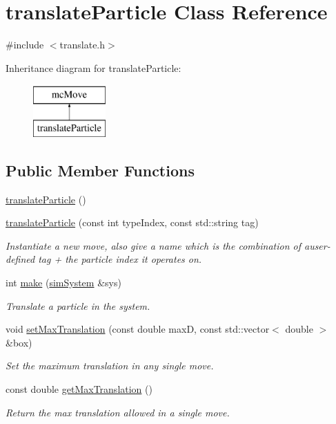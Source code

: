 \hypertarget{classtranslate_particle}{\section{translate\-Particle Class Reference}
\label{classtranslate_particle}
}


{\ttfamily \#include $<$translate.\-h$>$}

Inheritance diagram for translate\-Particle\-:\begin{figure}[H]
\begin{center}
\leavevmode
\includegraphics[height=2.000000cm]{classtranslate_particle}
\end{center}
\end{figure}
\subsection*{Public Member Functions}
\begin{DoxyCompactItemize}
\item 
\hyperlink{classtranslate_particle_ac16b682a2119d7ebd6c7df75fa224ab4}{translate\-Particle} ()
\item 
\hyperlink{classtranslate_particle_aa9ffcde3ec4cbd82e939c7cb9ee85094}{translate\-Particle} (const int type\-Index, const std\-::string tag)
\begin{DoxyCompactList}\small\item\em Instantiate a new move, also give a name which is the combination of auser-\/defined tag + the particle index it operates on. \end{DoxyCompactList}\item 
int \hyperlink{classtranslate_particle_a7ec5c9259f1aae3f7aefdb4db3ee5468}{make} (\hyperlink{classsim_system}{sim\-System} \&sys)
\begin{DoxyCompactList}\small\item\em Translate a particle in the system. \end{DoxyCompactList}\item 
void \hyperlink{classtranslate_particle_a2018196eaabe3a5b76761951b2991c41}{set\-Max\-Translation} (const double max\-D, const std\-::vector$<$ double $>$ \&box)
\begin{DoxyCompactList}\small\item\em Set the maximum translation in any single move. \end{DoxyCompactList}\item 
const double \hyperlink{classtranslate_particle_a1366867b0290b66f50c631bf2fd71946}{get\-Max\-Translation} ()
\begin{DoxyCompactList}\small\item\em Return the max translation allowed in a single move. \end{DoxyCompactList}\end{DoxyCompactItemize}
